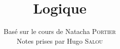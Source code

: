 \documentclass{../notes}
\title{Logique}
\author{Basé sur le cours de Natacha \textsc{Portier}\\ Notes prises par Hugo \textsc{Salou}}
\begin{document}
  \maketitle

  \dominitoc
  \tableofcontents

  \pagebreak

  
  
  
  
  
  
\end{document}
